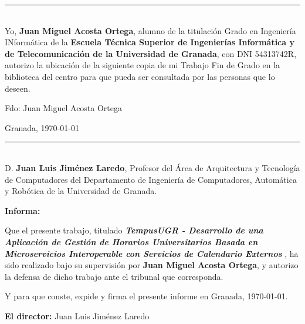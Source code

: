 \newpage \thispagestyle{empty} \mbox{} \newpage
\vspace{5cm}
\noindent\rule[-1ex]{\textwidth}{2pt}\\[4.5ex]

Yo, \textbf{Juan Miguel Acosta Ortega}, alumno de la titulación Grado en Ingeniería INformática de la \textbf{Escuela Técnica Superior
de Ingenierías Informática y de Telecomunicación de la Universidad de Granada}, con DNI 54313742R, autorizo la ubicación de la siguiente copia de mi Trabajo Fin de Grado en la biblioteca del centro para que pueda ser
consultada por las personas que lo deseen.

\vspace{6cm}

\noindent Fdo: Juan Miguel Acosta Ortega

\vspace{2cm}

\begin{flushright}
Granada, \today
\end{flushright}

\newpage \thispagestyle{empty} \mbox{} \newpage

\newpage
\vspace{5cm}
\noindent\rule[-1ex]{\textwidth}{2pt}\\[4.5ex]

D. \textbf{Juan Luis Jiménez Laredo}, Profesor del Área de Arquitectura y Tecnología de Computadores
del Departamento de Ingeniería de Computadores, Automática y Robótica de la Universidad de Granada.

\vspace{0.5cm}

\textbf{Informa:}

\vspace{0.5cm}

Que el presente trabajo, titulado \textit{\textbf{ TempusUGR - Desarrollo de una Aplicación de Gestión de Horarios Universitarios Basada en Microservicios Interoperable con Servicios de Calendario Externos }}, ha sido realizado bajo su supervisión por \textbf{Juan Miguel Acosta Ortega}, y autorizo la defensa de dicho trabajo ante el tribunal que corresponda.

\vspace{0.5cm}

Y para que conste, expide y firma el presente informe en Granada, \today.

\vspace{1cm}

\textbf{El director:} Juan Luis Jiménez Laredo

\newpage \thispagestyle{empty} \mbox{} \newpage